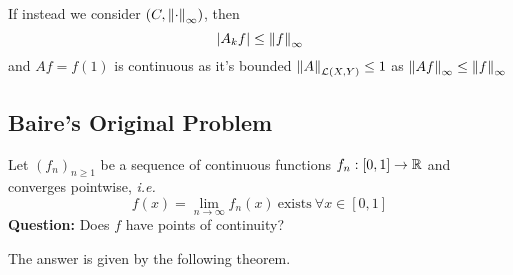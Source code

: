 \documentclass{article}
\begin{document}
\begin{remark}
    If instead we consider $(C, \left\|{\cdot}\right\|_\infty)$, then  
    $$
    |A_k f| \leq \left\|{f}\right\|_{\infty}
    $$
    and $Af=f(1)$ is continuous as it's bounded $\left\|{A}\right\|_{\mathcal{L}(X,Y)}\leq 1$ as $\left\|{Af}\right\|_{\infty} \leq \left\|{f}\right\|_\infty$
\end{remark}

\subsection{Baire's Original Problem}
Let $(f_n)_{n\geq 1}$ be a sequence of continuous functions $f_n: [0,1] \to \mathbb{R}$ and converges pointwise, \textit{i.e.}  
$$
f(x) = \lim_{n\to\infty} f_n(x) \ \text{exists} \ \forall x \in [0,1]
$$  
\textbf{Question:} Does $f$ have points of continuity?  

The answer is given by the following theorem.  
\end{document}
